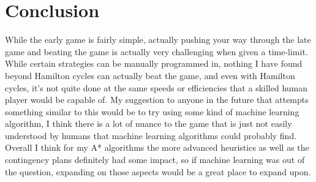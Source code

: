 \documentclass[letterpaper]{article} %
\begin{document}
\section{Conclusion}
While the early game is fairly simple, actually pushing your way through the late game and beating the game is actually very challenging when given a time-limit. While certain strategies can be manually programmed in, nothing I have found beyond Hamilton cycles can actually beat the game, and even with Hamilton cycles, it's not quite done at the same speeds or efficiencies that a skilled human player would be capable of. My suggestion to anyone in the future that attempts something similar to this would be to try using some kind of machine learning algorithm, I think there is a lot of nuance to the game that is just not easily understood by humans that machine learning algorithms could probably find. Overall I think for my A* algorithms the more advanced heuristics as well as the contingency plans definitely had some impact, so if machine learning was out of the question, expanding on those aspects would be a great place to expand upon.

\cite{*}


\end{document}
